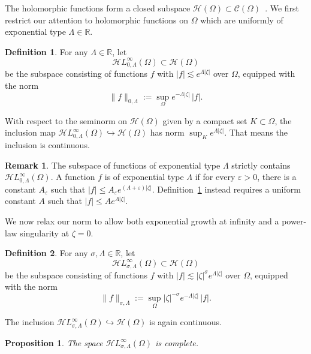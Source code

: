 \documentclass{article}
\theoremstyle{definition}
\newtheorem{definition}{Definition}
\newtheorem{rmk}{Remark}
\theoremstyle{plain}
\newtheorem{proposition}{Proposition}
\newcommand{\R}{\mathbb{R}}
\newcommand{\cont}{\mathcal{C}}
\newcommand{\holo}{\mathcal{H}}
\newcommand{\singexp}[2]{\mathcal{H}L^\infty_{#1, #2}}
\newcommand{\domain}{\Omega}
\begin{document}
The holomorphic functions form a closed subspace $\holo(\domain) \subset \cont(\domain)$~\cite[Proposition~3.14]{fnl-cpx-anal}. We first restrict our attention to holomorphic functions on $\domain$ which are uniformly of exponential type $\Lambda \in \R$.
\begin{definition}\label{def:unif-exp}
For any $\Lambda \in \R$, let
\[ \singexp{0}{\Lambda}(\domain) \subset \holo(\domain) \]
be the subspace consisting of functions $f$ with $|f| \lesssim e^{\Lambda|\zeta|}$ over $\domain$, equipped with the norm
\[ \|f\|_{0, \Lambda} := \sup_\Omega e^{-\Lambda|\zeta|}\,|f|. \]
\end{definition}
With respect to the seminorm on $\holo(\domain)$ given by a compact set $K \subset \domain$, the inclusion map $\singexp{0}{\Lambda}(\domain) \hookrightarrow \holo(\domain)$ has norm $\sup_K e^{\Lambda |\zeta|}$. That means the inclusion is continuous.
\begin{rmk}
The subspace of functions of exponential type $\Lambda$ strictly contains $\singexp{0}{\Lambda}(\domain)$. A function $f$ is of exponential type $\Lambda$ if for every $\varepsilon>0$, there is a constant $A_\varepsilon$ such that $|f|\le A_\varepsilon e^{(\Lambda+\varepsilon)|\zeta|}$. Definition~\ref{def:unif-exp} instead requires a uniform constant $A$ such that $|f| \le A e^{\Lambda|\zeta|}$.\end{rmk}
We now relax our norm to allow both exponential growth at infinity and a power-law singularity at $\zeta = 0$.
\begin{definition}
For any $\sigma, \Lambda \in \R$, let
\[ \singexp{\sigma}{\Lambda}(\domain) \subset \holo(\domain) \]
be the subspace consisting of functions $f$ with $|f| \lesssim |\zeta|^\sigma e^{\Lambda|\zeta|}$ over $\domain$, equipped with the norm
\[ \|f\|_{\sigma,\Lambda} := \sup_\Omega |\zeta|^{-\sigma} e^{-\Lambda|\zeta|}\,|f|. \]
\end{definition}
The inclusion $\singexp{\sigma}{\Lambda}(\domain) \hookrightarrow \holo(\domain)$ is again continuous.
\begin{proposition}\label{exp-complete}
The space $\singexp{\sigma}{\Lambda}(\domain)$ is complete.
\end{proposition}
\end{document}

